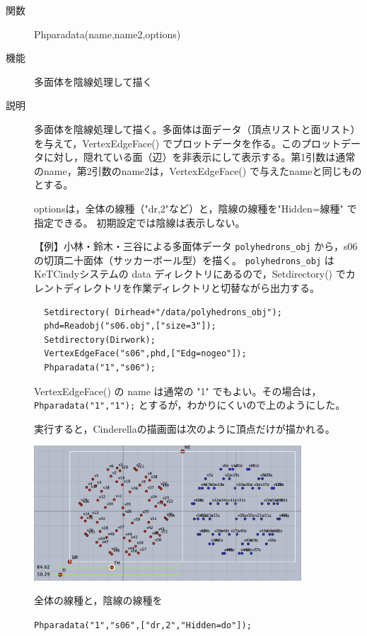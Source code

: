 \documentclass[papersize,a4paper,12pt,uplatex]{jsarticle}
\begin{document}
\begin{description}
\hypertarget{phparadata}{}
\item[関数]  Phparadata(name,name2,options)
\item[機能]  多面体を陰線処理して描く
\item[説明]  多面体を陰線処理して描く。多面体は面データ（頂点リストと面リスト）を与えて，VertexEdgeFace() でプロットデータを作る。このプロットデータに対し，隠れている面（辺）を非表示にして表示する。第1引数は通常のname，第2引数のname2は，VertexEdgeFace() で与えたnameと同じものとする。

  optionsは，全体の線種（"dr,2"など）と，陰線の線種を"Hidden=線種" で指定できる。 初期設定では陰線は表示しない。
  
\vspace{\baselineskip}
【例】小林・鈴木・三谷による多面体データ  \verb|polyhedrons_obj|  から，s06の切頂二十面体（サッカーボール型）を描く。 \verb|polyhedrons_obj| は KeTCindyシステムの data ディレクトリにあるので，Setdirectory() でカレントディレクトリを作業ディレクトリと切替ながら出力する。
\begin{verbatim}
  Setdirectory( Dirhead+"/data/polyhedrons_obj");
  phd=Readobj("s06.obj",["size=3"]);
  Setdirectory(Dirwork);
  VertexEdgeFace("s06",phd,["Edg=nogeo"]);
  Phparadata("1","s06");
\end{verbatim}
  VertexEdgeFace() の name は通常の "1" でもよい。その場合は，\verb|Phparadata("1","1");| とするが，わかりにくいので上のようにした。
  
実行すると，Cinderellaの描画面は次のように頂点だけが描かれる。

\vspace{\baselineskip}
\begin{center}
 \includegraphics[bb=0 0 726.04 365.02 , width=10cm]{Fig/phparadata01.pdf}
\end{center}
 
\vspace{\baselineskip}
全体の線種と，陰線の線種を
  
\verb|Phparadata("1","s06",["dr,2","Hidden=do"]);|


\end{description}
\end{document}

